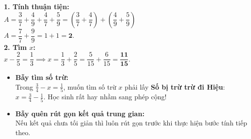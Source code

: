 \documentclass[14pt,a4paper,oneside]{extbook}
\begin{document}
\vspace{-2.5mm}
\noindent
\begin{minipage}[t]{0.49\textwidth}\vspace{0pt}
\begin{tcolorbox}[
  enhanced,
  colback=green!4!white,
  colframe=green!60!black,
  arc=2mm, boxrule=0.8pt,
  left=2mm, right=2mm, top=1.8mm, bottom=1.8mm,
  title={\footnotesize\bfseries\color{white}\faCheckCircle\ Ví dụ thực hành chuẩn mực}
]
{\footnotesize
\textbf{1. Tính thuận tiện:}\\
$A = \dfrac{3}{7} + \dfrac{4}{9} + \dfrac{4}{7} + \dfrac{5}{9} = \left(\dfrac{3}{7} + \dfrac{4}{7}\right) + \left(\dfrac{4}{9} + \dfrac{5}{9}\right)$\\
$A = \dfrac{7}{7} + \dfrac{9}{9} = 1 + 1 = \mathbf{2}$.\\
\textbf{2. Tìm $x$:}\\
$x - \dfrac{2}{5} = \dfrac{1}{3} \implies x = \dfrac{1}{3} + \dfrac{2}{5} = \dfrac{5}{15} + \dfrac{6}{15} = \mathbf{\dfrac{11}{15}}$.
}
\end{tcolorbox}
\end{minipage}
\hfill
\begin{minipage}[t]{0.49\textwidth}\vspace{0pt}
\begin{tcolorbox}[
  enhanced,
  colback=red!4!white,
  colframe=red!70!black,
  arc=2mm, boxrule=0.8pt,
  left=2mm, right=2mm, top=1.8mm, bottom=1.8mm,
  title={\footnotesize\bfseries\color{white}\faExclamationTriangle\ Mẹo tránh bẫy trắc nghiệm}
]
{\footnotesize
\begin{itemize}\setlength{\itemsep}{1.5pt}\setlength{\leftskip}{-2.5mm}
  \item \textbf{Bẫy tìm số trừ:}\\
  Trong $\frac{3}{4} - x = \frac{1}{5}$, muốn tìm số trừ $x$ phải lấy \textbf{Số bị trừ trừ đi Hiệu}: $x = \frac{3}{4} - \frac{1}{5}$. Học sinh rất hay nhầm sang phép cộng!
  \item \textbf{Bẫy quên rút gọn kết quả trung gian:}\\
  Nếu kết quả chưa tối giản thì luôn rút gọn trước khi thực hiện bước tính tiếp theo.
\end{itemize}
}
\end{tcolorbox}
\end{minipage}
\end{document}
